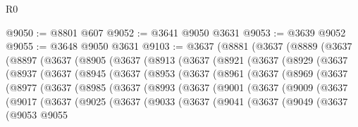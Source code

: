 \begin{lexlean}{R0}
\begin{coremodule}
@9050 := @8801 @607
@9052 := @3641 @9050 @3631
@9053 := @3639 @9052
@9055 := @3648 @9050 @3631
@9103 := @3637
    (@8881
      (@3637
        (@8889
          (@3637
            (@8897
              (@3637
                (@8905
                  (@3637
                    (@8913
                      (@3637
                        (@8921
                          (@3637
                            (@8929
                              (@3637
                                (@8937
                                  (@3637
                                    (@8945
                                      (@3637
                                        (@8953
                                          (@3637
                                            (@8961
                                              (@3637
                                                (@8969
                                                  (@3637
                                                    (@8977
                                                      (@3637
                                                        (@8985
                                                          (@3637
                                                            (@8993
                                                              (@3637
                                                                (@9001
                                                                  (@3637
                                                                    (@9009
                                                                      (@3637
                                                                        (@9017
                                                                          (@3637
                                                                            (@9025
                                                                              (@3637
                                                                                (@9033
                                                                                  (@3637
                                                                                    (@9041
                                                                                      (@3637
                                                                                        (@9049
                                                                                          (@3637
                                                                                            (@9053
                                                                                              @9055

\end{coremodule}
\end{lexlean}
